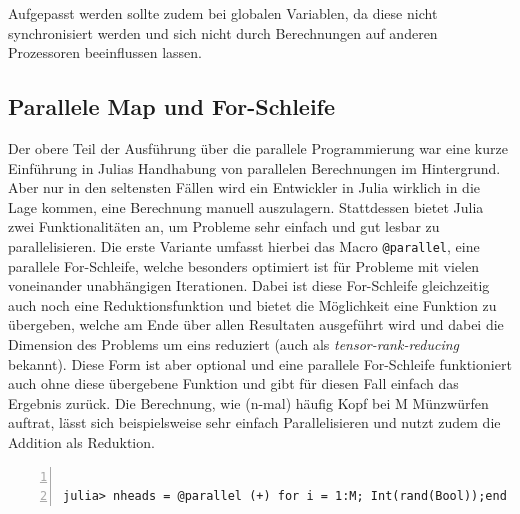 \documentclass[proseminar,german,utf8]{zihpub}
\begin{document}
Aufgepasst werden sollte zudem bei globalen Variablen, da diese nicht synchronisiert werden und sich nicht durch Berechnungen auf anderen Prozessoren beeinflussen lassen.~\cite{JuliaLangDocumentation}

\subsection{Parallele Map und For-Schleife }

Der obere Teil der Ausführung über die parallele Programmierung war eine kurze Einführung in Julias Handhabung von parallelen Berechnungen im Hintergrund. Aber nur in den seltensten Fällen wird ein Entwickler in Julia wirklich in die Lage kommen, eine Berechnung manuell auszulagern. Stattdessen bietet Julia zwei Funktionalitäten an, um Probleme sehr einfach und gut lesbar zu parallelisieren. Die erste Variante umfasst hierbei das Macro \verb|@parallel|, eine parallele For-Schleife, welche besonders optimiert ist für Probleme mit vielen voneinander unabhängigen Iterationen. Dabei ist diese For-Schleife gleichzeitig auch noch eine Reduktionsfunktion und bietet die Möglichkeit eine Funktion zu übergeben, welche am Ende über allen Resultaten ausgeführt wird und dabei die Dimension des Problems um eins reduziert (auch als \textit{tensor-rank-reducing} bekannt). Diese Form ist aber optional und eine parallele For-Schleife funktioniert auch ohne diese übergebene Funktion und gibt für diesen Fall einfach das Ergebnis zurück. Die Berechnung, wie (n-mal) häufig Kopf bei M Münzwürfen auftrat, lässt sich beispielsweise sehr einfach Parallelisieren und nutzt zudem die Addition als Reduktion.
\begin{Verbatim}[baselinestretch=1,fontsize=\scriptsize,numbers=left,stepnumber=5,xleftmargin=1cm,xrightmargin=1cm]

julia> nheads = @parallel (+) for i = 1:M; Int(rand(Bool));end

\end{Verbatim}
\end{document}
